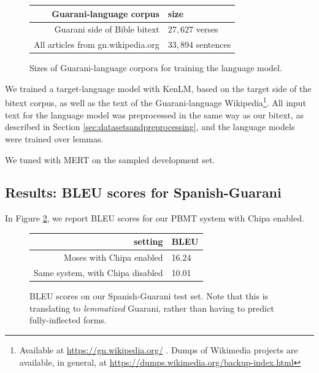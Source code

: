 \begin{figure}
  \begin{centering}
  \begin{tabulary}{\textwidth}{|R|L|}
    \hline
    Guarani-language corpus & size \\
    \hline
    Guarani side of Bible bitext &  $27,627$ verses \\
    \hline
    All articles from gn.wikipedia.org & $33,894$ sentences \\
    \hline
  \end{tabulary}
  \end{centering}
  \caption{Sizes of Guarani-language corpora for training the language model.}
  \label{fig:gn-lm-sizes}
\end{figure}


We trained a target-language model with KenLM\cite{Heafield-kenlm}, based on
the target side of the bitext corpus, as well as the text of the
Guarani-language Wikipedia\footnote{Available at
\url{https://gn.wikipedia.org/} . Dumps of Wikimedia projects are available, in
general, at \url{https://dumps.wikimedia.org/backup-index.html}}. All input
text for the language model was preprocessed in the same way as our bitext, as
described in Section \ref{sec:datasetsandpreprocessing}, and the language
models were trained over lemmas.

We tuned with MERT on the sampled development set.


\subsection{Results: BLEU scores for Spanish-Guarani}

In Figure \ref{fig:bleu-es-gn}, we report BLEU scores for our PBMT system with
Chipa enabled.

\begin{figure}
  \begin{centering}
  \begin{tabulary}{\textwidth}{|R|L|}
    \hline
    setting & BLEU \\
    \hline
    Moses with Chipa enabled &  16.24 \\
    \hline
    Same system, with Chipa disabled &  10.01 \\
    \hline
  \end{tabulary}
  \end{centering}
  \caption{BLEU scores on our Spanish-Guarani test set. Note that this is
  translating to \emph{lemmatized} Guarani, rather than having to predict
  fully-inflected forms.}
  \label{fig:bleu-es-gn}
\end{figure}



